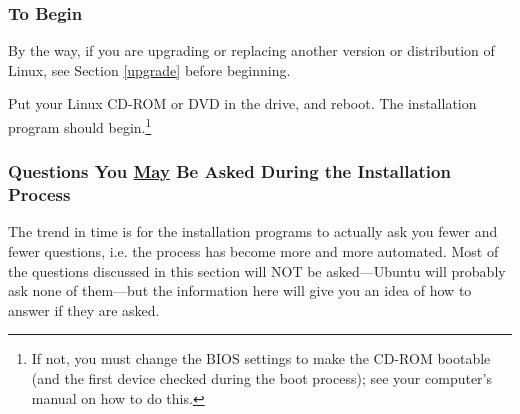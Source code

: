 \documentclass[11pt]{article}
\begin{document}
\subsubsection{To Begin}

By the way, if you are upgrading or replacing another version or
distribution of Linux, see Section \ref{upgrade} before beginning.

Put your Linux CD-ROM or DVD in the drive, and reboot.  The installation
program should begin.\footnote{\label{bios} If not, you must change the
BIOS settings to make the CD-ROM bootable (and the first device checked
during the boot process); see your computer's manual on how to do this.}

\subsubsection{Questions You \underline{May} Be Asked During the
Installation Process}

The trend in time is for the installation programs to actually ask you
fewer and fewer questions, i.e. the process has become more and more
automated.  Most of the questions discussed in this section will NOT be
asked---Ubuntu will probably ask none of them---but the information here
will give you an idea of how to answer if they are asked.
\end{document}
